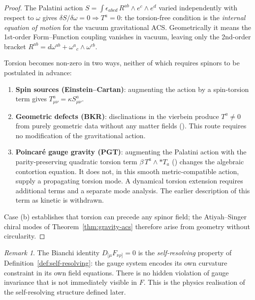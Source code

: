 \documentclass[12pt,a4paper]{article}
\theoremstyle{plain}
\theoremstyle{definition}
\theoremstyle{remark}
\newtheorem{remark}[theorem]{Remark}
\begin{document}
\begin{proof}
The Palatini action $S = \int \epsilon_{abcd}\, R^{ab} \wedge e^c \wedge e^d$
varied independently with respect to $\omega$ gives $\delta S/\delta\omega = 0
\Rightarrow T^a = 0$: the torsion-free condition is the \emph{internal equation
of motion} for the vacuum gravitational ACS.  Geometrically it means the
1st-order Form--Function coupling vanishes in vacuum, leaving only the
2nd-order bracket $R^{ab} = d\omega^{ab} + \omega^a{}_c\wedge\omega^{cb}$.

Torsion becomes non-zero in two ways, neither of which requires spinors
to be postulated in advance:
\begin{enumerate}[noitemsep,label=(\alph*)]
  \item \textbf{Spin sources (Einstein--Cartan)}: augmenting the action by
    a spin-torsion term gives $T^a_{\mu\nu} = \kappa S^a_{\mu\nu}$.
  \item \textbf{Geometric defects (BKR)}: disclinations in the vierbein produce
    $T^a \neq 0$ from purely geometric data without any matter fields
    (\cite{BKR1955}).  This route requires no
    modification of the gravitational action.
  \item \textbf{Poincar\'{e} gauge gravity (PGT)}: augmenting the Palatini action
    with the parity-preserving quadratic torsion term
    $\beta\,T^a\wedge{*T_a}$ (\cite{Kibble1961,Sciama1964,Hehl1976})
    changes the algebraic contortion equation. It does not, in this smooth
    metric-compatible action, supply a propagating torsion mode. A dynamical
    torsion extension requires additional terms and a separate mode analysis.
    The earlier description of this term as kinetic is withdrawn.
\end{enumerate}
Case (b) establishes that torsion can precede any spinor field; the
Atiyah--Singer chiral modes of Theorem~\ref{thm:gravity-acs} therefore
arise from geometry without circularity.
\end{proof}

\begin{remark}
The Bianchi identity $D_{[\mu}F_{\nu\rho]} = 0$ is the \emph{self-resolving} 
property of Definition~\ref{def:self-resolving}: the gauge system encodes its 
own curvature constraint in its own field equations.  
There is no hidden violation of gauge invariance that is not 
immediately visible in $F$.  This is the physics realisation of the 
self-resolving structure defined later.
\end{remark}
\end{document}
